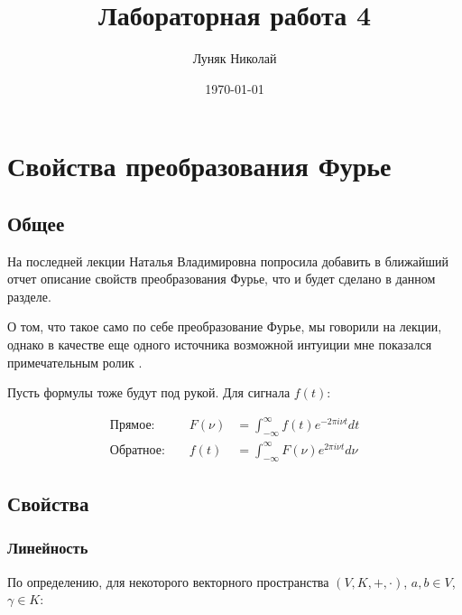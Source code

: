 \documentclass[a4paper,12pt]{report}
\author{Луняк Николай}
\title{Лабораторная работа 4}
\date{\today}
\begin{document}
    \maketitle
    \tableofcontents
    \listoffigures
    \lstlistoflistings
    
    \chapter{Свойства преобразования Фурье}
    
    \section{Общее}
    
    На последней лекции Наталья Владимировна попросила добавить в ближайший отчет описание свойств преобразования Фурье, что и будет сделано в данном разделе.
    
    О том, что такое само по себе преобразование Фурье, мы говорили на лекции, однако в качестве еще одного источника возможной интуиции мне показался примечательным ролик  \cite{furv}.
    
    Пусть формулы тоже будут под рукой. Для сигнала $f(t)$:

    
    \[
        \begin{aligned}
            \text{Прямое: } && F(\nu) &= \int_{-\infty}^{\infty} f(t) e^{-2\pi i\nu t} dt \\
            \text{Обратное: } && f(t) &=  \int_{-\infty}^{\infty} F(\nu) e^{2\pi i\nu t} d\nu
        \end{aligned}
    \]
    
    \section{Свойства}
    
    \subsection{Линейность}
    
    По определению, для некоторого векторного пространства $(V,K,+,\cdot)$, $a,b \in V$, $\gamma \in K$:
    
\end{document}
